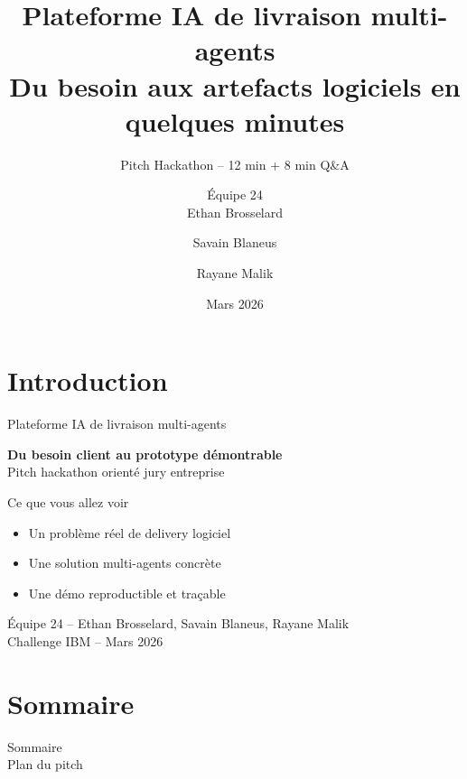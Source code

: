 \documentclass[aspectratio=169,10pt]{beamer}
\title[Plateforme IA multi-agents]{Plateforme IA de livraison multi-agents\\\large Du besoin aux artefacts logiciels en quelques minutes}
\subtitle{Pitch Hackathon -- 12 min + 8 min Q\&A}
\author{Équipe 24\\Ethan Brosselard \and Savain Blaneus \and Rayane Malik}
\institute{Challenge IBM}
\date{Mars 2026}
\begin{document}
\section{Introduction}
\begin{frame}{Plateforme IA de livraison multi-agents}
  \vspace{0.4cm}
  \begin{center}
    {\Large\textbf{Du besoin client au prototype démontrable}}\\[0.3cm]
    {\normalsize Pitch hackathon orienté jury entreprise}\\[0.8cm]
  \end{center}

  \begin{block}{Ce que vous allez voir}
  \begin{itemize}
    \item Un problème réel de delivery logiciel
    \item Une solution multi-agents concrète
    \item Une démo reproductible et traçable
  \end{itemize}
  \end{block}

  \vfill
  \begin{center}
    {\small Équipe 24 -- Ethan Brosselard, Savain Blaneus, Rayane Malik}\\
    {\small Challenge IBM -- Mars 2026}
  \end{center}
\end{frame}

\section{Sommaire}
\begin{frame}{Sommaire\\Plan du pitch}
\tableofcontents
\end{frame}

\end{document}

